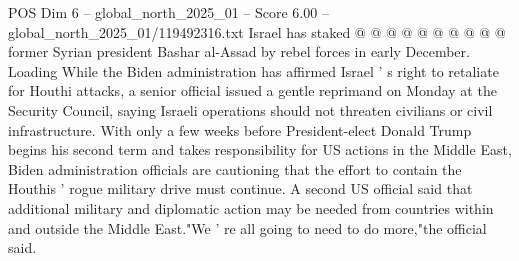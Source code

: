 \begin{textsample}{POS Dim 6 – global\_north\_2025\_01 – Score 6.00 – global\_north\_2025\_01/119492316.txt}
Israel has staked @ @ @ @ @ @ @ @ @ @ former Syrian president Bashar al-Assad by rebel forces in early December.
Loading While the Biden administration has affirmed Israel ' s right to retaliate for Houthi attacks, a senior official issued a gentle reprimand on Monday at the Security Council, saying Israeli operations should not threaten civilians or civil infrastructure.
With only a few weeks before President-elect Donald Trump begins his second term and takes responsibility for US actions in the Middle East, Biden administration officials are cautioning that the effort to contain the Houthis ' rogue military drive must continue.
A second US official said that additional military and diplomatic action may be needed from countries within and outside the Middle East."We ' re all going to need to do more,"the official said.

\end{textsample}
